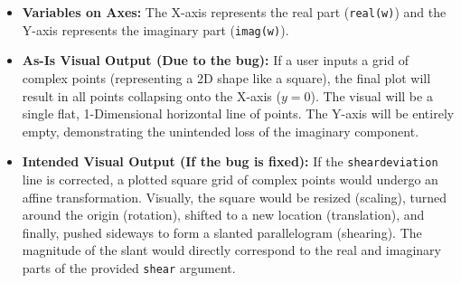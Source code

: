 \begin{itemize}
    \item \textbf{Variables on Axes:} The X-axis represents the real part (\texttt{real(w)}) and the Y-axis represents the imaginary part (\texttt{imag(w)}).
    
    \item \textbf{As-Is Visual Output (Due to the bug):} 
    If a user inputs a grid of complex points (representing a 2D shape like a square), the final plot will result in all points collapsing onto the X-axis ($y=0$). The visual will be a single flat, 1-Dimensional horizontal line of points. The Y-axis will be entirely empty, demonstrating the unintended loss of the imaginary component.

    \item \textbf{Intended Visual Output (If the bug is fixed):}
    If the \texttt{sheardeviation} line is corrected, a plotted square grid of complex points would undergo an affine transformation. Visually, the square would be resized (scaling), turned around the origin (rotation), shifted to a new location (translation), and finally, pushed sideways to form a slanted parallelogram (shearing). The magnitude of the slant would directly correspond to the real and imaginary parts of the provided \texttt{shear} argument.
\end{itemize}
